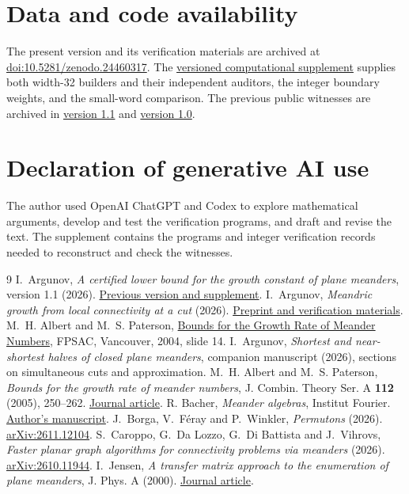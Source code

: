 \documentclass[11pt]{article}
\begin{document}
\section*{Data and code availability}
The present version and its verification materials are archived at \href{https://doi.org/10.5281/zenodo.24460317}{doi:10.5281/zenodo.24460317}. The \href{https://github.com/Kimargin8/meander-growth-bound/releases/tag/v1.2.0}{versioned computational supplement} supplies both width-32 builders and their independent auditors, the integer boundary weights, and the small-word comparison. The previous public witnesses are archived in \href{https://doi.org/10.5281/zenodo.24449944}{version 1.1} and \href{https://doi.org/10.5281/zenodo.24448957}{version 1.0}.

\section*{Declaration of generative AI use}
The author used OpenAI ChatGPT and Codex to explore mathematical arguments, develop and test the verification programs, and draft and revise the text. The supplement contains the programs and integer verification records needed to reconstruct and check the witnesses.

\begin{thebibliography}{9}\small
{} I.~Argunov, \emph{A certified lower bound for the growth constant of plane meanders}, version 1.1 (2026). \href{https://doi.org/10.5281/zenodo.24449944}{Previous version and supplement}.
 I.~Argunov, \emph{Meandric growth from local connectivity at a cut} (2026). \href{https://doi.org/10.5281/zenodo.24457226}{Preprint and verification materials}.
 M.~H. Albert and M.~S. Paterson, \href{https://cs.otago.ac.nz/research/theory/Talks/Meanders.pdf}{Bounds for the Growth Rate of Meander Numbers}, FPSAC, Vancouver, 2004, slide 14.
 I.~Argunov, \emph{Shortest and near-shortest halves of closed plane meanders}, companion manuscript (2026), sections on simultaneous cuts and approximation.
 M.~H. Albert and M.~S. Paterson, \emph{Bounds for the growth rate of meander numbers}, J. Combin. Theory Ser. A \textbf{112} (2005), 250--262.
\href{https://doi.org/10.1016/j.jcta.2005.02.006}{Journal article}.
 R. Bacher, \emph{Meander algebras}, Institut Fourier.
\href{https://www-fourier.univ-grenoble-alpes.fr/sites/default/files/ref_478.pdf}{Author's manuscript}.
 J.~Borga, V.~F\'eray and P.~Winkler, \emph{Permutons} (2026).
\href{https://arxiv.org/abs/2611.12104}{arXiv:2611.12104}.
 S.~Caroppo, G.~Da Lozzo, G.~Di Battista and J.~Vihrovs, \emph{Faster planar graph algorithms for connectivity problems via meanders} (2026).
\href{https://arxiv.org/abs/2610.11944}{arXiv:2610.11944}.
 I.~Jensen, \emph{A transfer matrix approach to the enumeration of plane meanders}, J. Phys. A (2000).
\href{https://doi.org/10.1088/0305-4470/33/34/301}{Journal article}.
\end{thebibliography}
\end{document}
